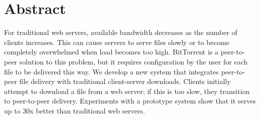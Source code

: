\section {Abstract}
For traditional web servers, available bandwidth decreases as the number of clients increases.  
This can cause servers to serve files slowly or to become completely overwhelmed when load becomes too high.
BitTorrent is a peer-to-peer solution to this problem, but it requires configuration by the user for each
file to be delivered this way.
We develop a new system that integrates peer-to-peer file delivery with traditional client-server downloads.  
Clients initially attempt to download a file from a web server; if this is too slow, they transition to peer-to-peer
delivery.  Experiments with a prototype system show that it serves up to 30x better than traditional web servers.